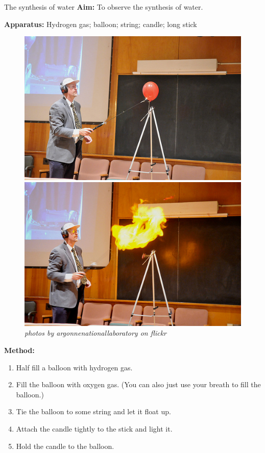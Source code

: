             \begin{g_experiment}{The synthesis of water}
            \nopagebreak
            \label{m38709*id63175}\noindent{}\textbf{Aim:}\newline
    To observe the synthesis of water.\par 
        \label{m38709*id63194}\noindent{}\textbf{Apparatus:}\newline
    Hydrogen gas; balloon; string; candle; long stick\par 
      \label{m38709*id63199}
    \setcounter{subfigure}{0}
	\begin{figure}[H] %
    \begin{center}
\includegraphics[width=.3\textwidth]{photos/hydrogen_balloon1.jpg} 
\includegraphics[width=.3\textwidth]{photos/hydrogen_balloon2_argonnenationallaboratory.jpg} \\
\textsl{photos by argonnenationallaboratory on flickr}
    \end{center}
 \end{figure}  
        \label{m38709*id63206}\noindent{}\textbf{Method:}\label{m38709*id63212}\begin{enumerate}[noitemsep, label=\textbf{\arabic*}. ] 
\item Half fill a balloon with hydrogen gas.
\item Fill the balloon with oxygen gas. (You can also just use your breath to fill the balloon.)
\item Tie the balloon to some string and let it float up.
\item Attach the candle tightly to the stick and light it.
\item Hold the candle to the balloon.
\end{enumerate}

\end{g_experiment}
